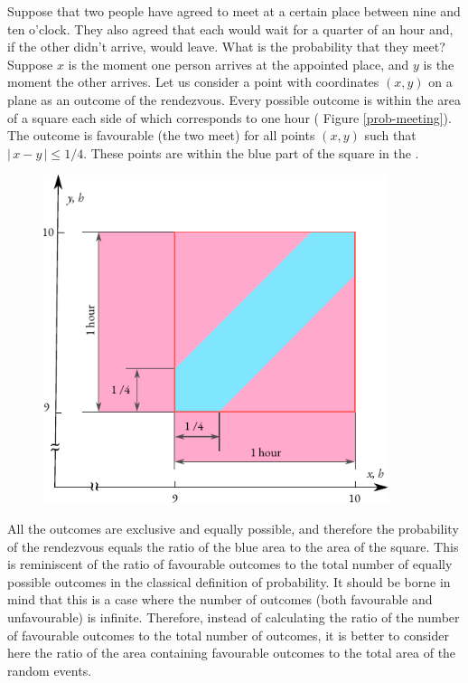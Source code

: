 Suppose that two people have agreed to meet at a certain place between
nine and ten o'clock. They also agreed that each would wait for a
quarter of an hour and, if the other didn't arrive, would leave. What
is the probability that they meet?  Suppose $x$ is the moment one
person arrives at the appointed place, and $y$ is the moment the other
arrives. Let us consider a point with coordinates $(x, y)$ on a plane
as an outcome of the rendezvous. Every possible outcome is within the
area of a square each side of which corresponds to one hour ( Figure
\ref{prob-meeting}). The outcome is favourable (the two meet) for all
points $(x, y)$ such that $\vert \, x - y \, \vert \le 1/4$. These
points are within the blue part of the square in the . 
  
  \begin{figure}[ht]
 \centering
 \includegraphics[width=0.9\textwidth]{figures/prob-meeting.pdf}
 \end{figure}
  
  All the outcomes are exclusive
and equally possible, and therefore the probability of the rendezvous
equals the ratio of the blue area to the area of the square. This
is reminiscent of the ratio of favourable outcomes to the total number
of equally possible outcomes in the classical definition of
probability. It should be borne in mind that this is a case where the
number of outcomes (both favourable and unfavourable) is
infinite. Therefore, instead of calculating the ratio of the number of
favourable outcomes to the total number of outcomes, it is better to
consider here the ratio of the area containing favourable outcomes to
the total area of the random events.




